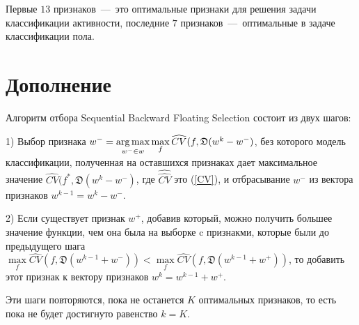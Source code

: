 \documentclass[12pt, twoside]{article}
\begin{document}
Первые $13$ признаков~---~это оптимальные признаки для решения задачи классификации активности, последние $7$ признаков~---~оптимальные в задаче классификации пола.


\section{ Дополнение}
\label{dop}

Алгоритм отбора Sequential Backward Floating Selection состоит из двух шагов:

1) Выбор признака $w^- = \argmax\limits_{w^- \in w} \max\limits_{f}\widehat{CV}(f, \mathfrak{D}(w^k-w^-)$, без которого модель классификации, полученная на оставшихся признаках дает максимальное значение $\widehat{CV}(f^*, \mathfrak{D}(w^k-w^-)$, где $\widehat{\hat{CV}}$ это (\ref{CV}), и отбрасывание $w^-$ из вектора признаков $w^{k-1}=w^k-w^-$.

2) Если существует признак $w^+$, добавив который, можно получить большее значение функции, чем она была на выборке c признакми, которые были до предыдущего шага $\max\limits_f \widehat{CV}(f, \mathfrak{D}(w^{k-1}+w^-))<\max\limits_f \widehat{CV}(f, \mathfrak{D}(w^{k-1}+w^+))$, то добавить этот признак к вектору признаков $w^k = w^{k-1}+w^+$.

Эти шаги повторяются, пока не останется $K$ оптимальных признаков, то есть пока не будет достигнуто равенство $k=K$.
\end{document}
